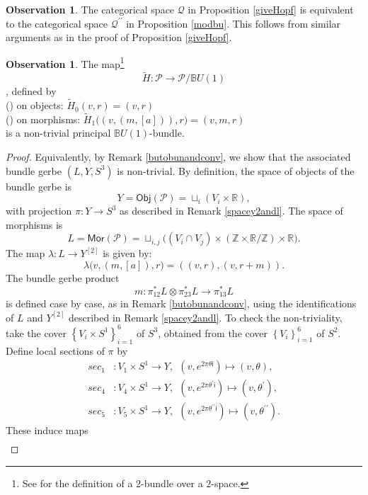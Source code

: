 \documentclass{article}
\theoremstyle{plain}
\theoremstyle{definition}
\newtheorem{obs}[thm]{Observation}
\newcommand{\rNum}[1]{\lowercase\expandafter{\romannumeral #1\relax}}
\begin{document}
\begin{obs}
The categorical space $\mathcal{Q}$ in Proposition \ref{giveHopf} is equivalent to the categorical space $\mathcal{Q}^{\prime\prime}$ in Proposition \ref{modbu}. This follows from similar arguments as in the proof of Proposition \ref{giveHopf}.
\end{obs}
\begin{obs}\label{mapH}
The map\footnote{See \cite{MR2709030} for the definition of a $2$-bundle over a $2$-space.} $$\widetilde{H}:\mathcal{P} \longrightarrow \mathcal{P}/\mathbb{B}U(1)$$, defined by \\
(\rNum{1}) on objects: $\widetilde{H}_0(v,r) = (v,r)$ \\
(\rNum{2}) on morphisms: $\widetilde{H}_1\bigl((v,(m,[a])),r\bigr) = (v,m,r)$ \\
is a non-trivial principal $\mathbb{B}U(1)$-bundle.
\begin{proof}
Equivalently, by Remark \ref{butobunandconv}, we show that the associated bundle gerbe $(L,Y,S^3)$ is non-trivial. By definition, the space of objects of the bundle gerbe is
\[
Y = \mathsf{Obj}(\mathcal{P}) = \sqcup_i (V_i \times \mathbb{R}),
\]
with projection $\pi:Y \longrightarrow S^3$ as described in Remark \ref{spacey2andl}. The space of morphisms is
$$L = \mathsf{Mor}(\mathcal{P}) = \sqcup_{i,j} \bigl((V_i \cap V_j) \times (\mathbb{Z} \times \mathbb{R}/\mathbb{Z}) \times \mathbb{R}\bigr).$$
The map $\lambda:L \longrightarrow Y^{[2]}$ is given by:
\[
\lambda\bigl(v,(m,[a]),r\bigr) = \left((v,r),(v,r+m)\right).
\]
The bundle gerbe product
$$m:\pi_{12}^*L \otimes \pi_{23}^*L \longrightarrow \pi_{13}^*L$$
is defined case by case, as in Remark \ref{butobunandconv}, using the identifications of $L$ and $Y^{[2]}$ described in Remark \ref{spacey2andl}. To check the non-triviality, take the cover $\left\{V_i \times S^1\right\}_{i=1}^6$ of $S^3$, obtained from the cover $\left\{V_i\right\}_{i=1}^6$ of $S^2$. Define local sections of $\pi$ by
\begin{align*}
sec_1&:V_1 \times S^1 \longrightarrow Y, ~~ (v,e^{2\pi\theta\mathsf{i}}) \longmapsto (v,\theta), \\
sec_4&:V_4 \times S^1 \longrightarrow Y, ~~ (v,e^{2\pi\theta^\prime\mathsf{i}}) \longmapsto (v,\theta^\prime), \\
sec_5&:V_5 \times S^1 \longrightarrow Y, ~~ (v,e^{2\pi\theta^{\prime\prime}\mathsf{i}}) \longmapsto (v,\theta^{\prime\prime}).
\end{align*}
These induce maps
\begin{align*}

\end{align*}
\end{proof}
\end{obs}
\end{document}
